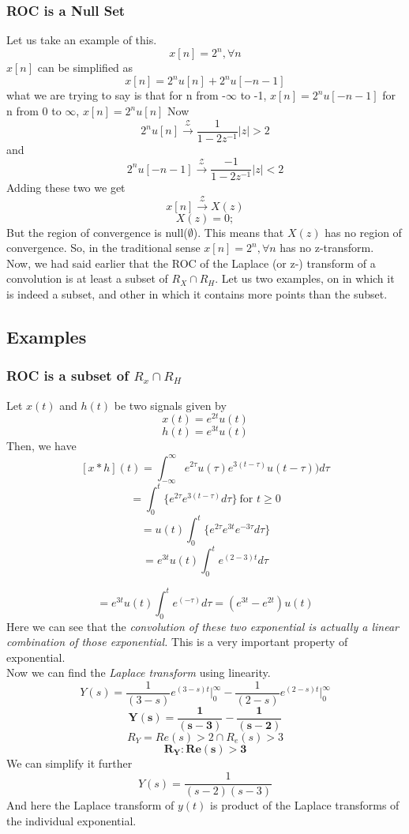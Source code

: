 {\subsubsection{ROC is a Null Set}
Let us take an example of this.
\[ 
x[n]  =   2^n,\forall n
\]
$x[n]$ can be simplified as
\[
x[n]  =    2^n u[n]+ 2^n u[-n-1]
\]
what we are trying to say is that
for n from -$\infty$ to -1, 	$x[n]  =   2^n u[-n-1]$
for n from 0 to $\infty$, 		$x[n]  =   2^n u[n]$
Now 
\[
2^n u[n] \xrightarrow{\mathcal{Z}} \frac{1}{1-2z^{-1}} |z| > 2
\]
and 
\[
2^n u[-n-1] \xrightarrow{\mathcal{Z}} \frac{-1}{1-2z^{-1}} |z| < 2
\]
Adding these two we get
\[
x[n]\xrightarrow{\mathcal{Z}} X(z)
\]
\[
X(z) =0;
\]
But the region of convergence is null($\emptyset$). This means that $X(z)$ has no region of convergence.
So, in the traditional sense $x[n] = 2^n,\forall n$ has no z-transform.\\
Now, we had said earlier that the ROC of the Laplace (or z-) transform of a convolution is at least a subset of $R_X \cap R_H$. Let us two examples, on in which it is indeed a subset, and other in which it contains more points than the subset.
\subsection{Examples}
\subsubsection{ROC is a subset of $R_x \cap R_H$}
Let $x(t)$ and $h(t)$ be two signals given by
\[
x(t)= e^{2t}u(t)
\]
\[
h(t)= e^{3t}u(t)
\]
Then, we have
\[
[x*h](t)  = \int_{-\infty}^{\infty}{e^{2\tau}u(\tau)e^{3(t-\tau)}u(t-\tau))d\tau} 
\]
\[
=\int_{0}^{t}\{ {e^{2\tau}e^{3(t-\tau)}d\tau \} } \ \text{for } t \geq 0
\]
\[
= u(t) \int_{0}^{t}\{ {e^{2\tau} e^{3t} e^{-3\tau}d\tau \} } 
\]
\[
= e^{3t}u(t) \int_{0}^{t}{e^{(2-3)t}d\tau}
\]

\[
= e^{3t}u(t)\int_{0}^{t}{e^{(-\tau)}d\tau} = (e^{3t}-e^{2t})u(t)
\]
Here we can see that the \emph{
convolution of these two exponential is actually a linear combination of those exponential.} This is a very important property of exponential.\\
Now we can find the \textit{Laplace transform} using linearity.
\[
Y(s) = \frac{1}{(3-s)}e^{(3-s)t}\Big|_0^{\infty} -  \frac{1}{(2 - s)}e^{(2-s)t}\Big|_0^{\infty}
\]
\[
\mathbf{Y(s) = \frac{1}{(s - 3)} - \frac{1}{(s - 2)}}
\]
\[
R_Y = Re(s) > 2 \cap R_e(s) > 3
\]
\[
\mathbf{R_Y : Re(s) > 3}
\]
We can simplify it further 
\[
Y(s)=\frac{1}{(s-2)(s-3)}
\]
And here the Laplace transform of $y(t)$ is product of the Laplace transforms of the individual exponential.
}
